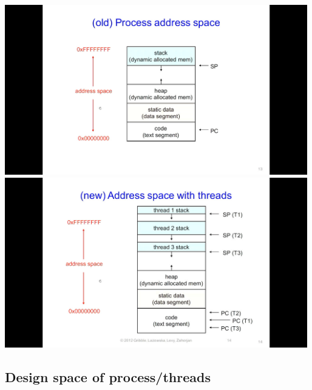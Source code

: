 \documentclass[11pt,a4paper]{article}
\begin{document}
\includegraphics[height=280]{process-address-space.jpg}
\includegraphics[height=280]{process-address-space-threads.jpg}

\subsection{Design space of process/threads}
\end{document}
